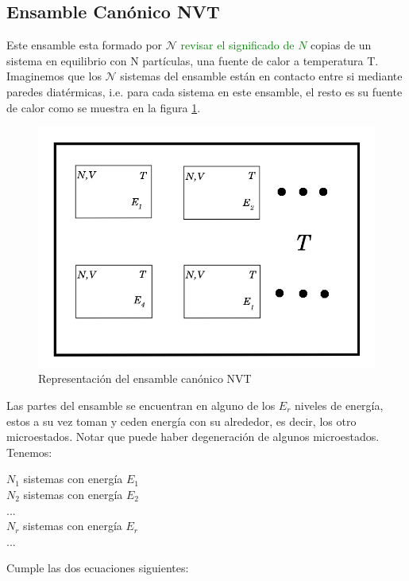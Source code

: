 \subsection{Ensamble Canónico NVT}

Este ensamble esta formado por $\mathcal{N}$ 
\textcolor{green}{revisar el significado de $N$} copias de un sistema en equilibrio con N partículas, una fuente de calor a temperatura T. Imaginemos que los $\mathcal{N}$ sistemas del ensamble están en contacto entre si mediante paredes diatérmicas, i.e. para cada sistema en este ensamble, el resto es su fuente de calor como se muestra en la figura \ref{fig:CanonicEns}.\\

\begin{figure}[!h]
    \centering
    \includegraphics[width=.55\textwidth,keepaspectratio=true]{EnsCanonico.png}
    \caption{Representación del ensamble canónico NVT \cite{belof2013alternative}}
    \label{fig:CanonicEns}
\end{figure}

\newpage

Las partes del ensamble se encuentran en alguno de los $E_r$ niveles de energía, estos a su vez toman y ceden energía con su alrededor, es decir, los otro microestados. Notar que puede haber degeneración de algunos microestados.\\

Tenemos:\\
\begin{center}
    $N_1$ sistemas con energía $E_1$\\
    $N_2$ sistemas con energía $E_2$\\
    ...\\
    $N_r$ sistemas con energía $E_r$\\
    ...\\
\end{center}


Cumple las dos ecuaciones siguientes:

